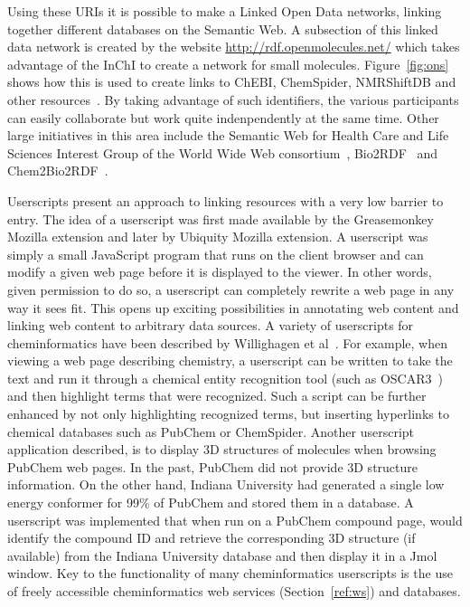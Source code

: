 \documentclass[11pt]{book}
\begin{document}
Using these URIs it is possible to make a Linked Open Data
networks, linking together different databases on the
Semantic Web. A subsection of this linked data network
is created by the website \url{http://rdf.openmolecules.net/}
which takes advantage of the InChI to create a network for
small molecules. Figure~\ref{fig:ons} shows how this is used
to create links to ChEBI, ChemSpider, NMRShiftDB and other
resources~\cite{Willighagen2010jbiomedsem}. By taking
advantage of such identifiers, the various participants
can easily collaborate but work quite indenpendently at the
same time. Other large initiatives in this area include
the Semantic Web for Health Care and Life Sciences Interest Group of the
World Wide Web consortium~\cite{hclsig},
Bio2RDF~\cite{Belleau2008} and Chem2Bio2RDF~\cite{Chen2010}.

Userscripts present an approach to linking resources with a very low
barrier to entry. The idea of a userscript was first made available by
the Greasemonkey Mozilla extension and later by Ubiquity Mozilla
extension. A userscript was simply a small JavaScript program that
runs on the client browser and can modify a given web page before it
is displayed to the viewer. In other words, given permission to do so,
a userscript can completely rewrite a web page in any way it sees
fit. This opens up exciting possibilities in annotating web content
and linking web content to arbitrary data sources. A variety of
userscripts for cheminformatics have been described by Willighagen et
al~\cite{Willighagen2007b}. For example, when viewing a web page describing
chemistry, a userscript can be written to take the text and run it
through a chemical entity recognition tool (such as OSCAR3~\cite{Corbett2006}) and
then highlight terms that were recognized. Such a script can be further
enhanced by not only highlighting recognized terms, but inserting
hyperlinks to chemical databases such as PubChem or
ChemSpider. Another userscript application described, is to
display 3D structures of molecules when browsing PubChem web pages. In
the past, PubChem did not provide 3D structure information. On the
other hand, Indiana University had generated a single low energy
conformer for 99\% of PubChem and stored them in a database. A
userscript was implemented that when run on a PubChem compound page,
would identify the compound ID and retrieve the corresponding 3D
structure (if available) from the Indiana University database and then
display it in a Jmol window. Key to the functionality of many
cheminformatics userscripts is the use of freely accessible
cheminformatics web services (Section~\ref{ref:ws}) and databases.
\end{document}
